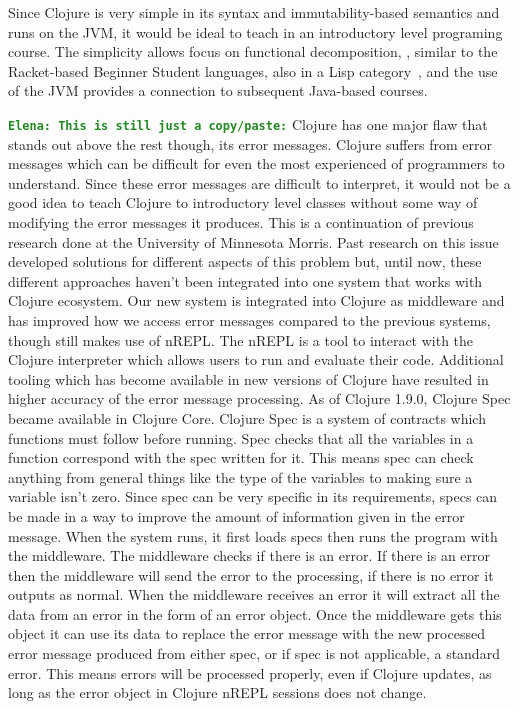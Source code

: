 \documentclass[12pt]{article}
\newcommand{\comment}[1]{{\bf \tt  {#1}}}
\newcommand{\emcomment}[1]{\textcolor{ForestGreen}{\comment{Elena: {#1}}}}
\begin{document}
Since Clojure is very simple in its syntax and immutability-based semantics and runs on the JVM, it would be ideal to teach in an introductory level programing course.
The simplicity allows focus on functional decomposition, , similar to 
the Racket-based Beginner Student languages, also in a Lisp category~\cite{htdp}, and the use of the JVM provides a connection to subsequent Java-based courses. 

\emcomment{This is still just a copy/paste:}
Clojure has one major flaw that stands out above the rest though, its error messages. Clojure suffers from error messages which can be difficult for even the most experienced of programmers to understand. Since these error messages are difficult to interpret, it would not be a good idea to teach Clojure to introductory level classes without some way of modifying the error messages it produces. 
This is a continuation of previous research done at the University of Minnesota Morris. Past research on this issue developed solutions for different aspects of this problem but, until now, these different approaches haven’t been integrated into one system that works with Clojure ecosystem. Our new system is integrated into Clojure as middleware and has improved how we access error messages compared to the previous systems, though still makes use of nREPL. The nREPL is a tool to interact with the Clojure interpreter which allows users to run and evaluate their code. Additional tooling which has become available in new versions of Clojure have resulted in higher accuracy of the error message processing. 
As of Clojure 1.9.0, Clojure Spec became available in Clojure Core. Clojure Spec is a system of contracts which functions must follow before running. Spec checks that all the variables in a function correspond with the spec written for it. This means spec can check anything from general things like the type of the variables to making sure a variable isn’t zero. Since spec can be very specific in its requirements, specs can be made in a way to improve the amount of information given in the error message. 
When the system runs, it first loads specs then runs the program with the middleware. The middleware checks if there is an error. If there is an error then the middleware will send the error to the processing, if there is no error it outputs as normal. When the middleware receives an error it will extract all the data from an error in the form of an error object. Once the middleware gets this object it can use its data to replace the error message with the new processed error message produced from either spec, or if spec is not applicable, a standard error. This means errors will be processed properly, even if Clojure updates, as long as the error object in Clojure nREPL sessions does not change.  
\end{document}
